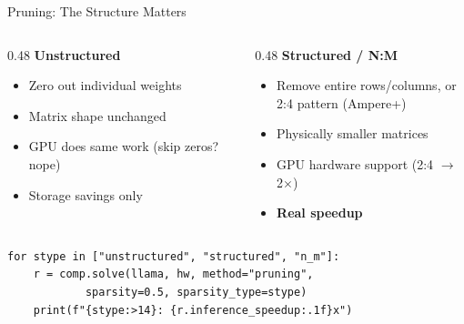 \documentclass[aspectratio=169, 12pt]{beamer}
\begin{document}
\begin{frame}[fragile]{Pruning: The Structure Matters}

\small
\begin{columns}[T]
\begin{column}{0.48\textwidth}
\textbf{Unstructured}
\begin{itemize}\setlength\itemsep{2pt}
  \item Zero out individual weights
  \item Matrix shape unchanged
  \item GPU does same work (skip zeros? nope)
  \item \alert{Storage savings only}
\end{itemize}
\end{column}
\begin{column}{0.48\textwidth}
\textbf{Structured / N:M}
\begin{itemize}\setlength\itemsep{2pt}
  \item Remove entire rows/columns, or\\
        2:4 pattern (Ampere+)
  \item Physically smaller matrices
  \item GPU hardware support (2:4 $\to$ 2$\times$)
  \item \textbf{Real speedup}
\end{itemize}
\end{column}
\end{columns}

\vspace{0.3cm}
\begin{lstlisting}
for stype in ["unstructured", "structured", "n_m"]:
    r = comp.solve(llama, hw, method="pruning",
            sparsity=0.5, sparsity_type=stype)
    print(f"{stype:>14}: {r.inference_speedup:.1f}x")
\end{lstlisting}
\end{frame}
\end{document}

